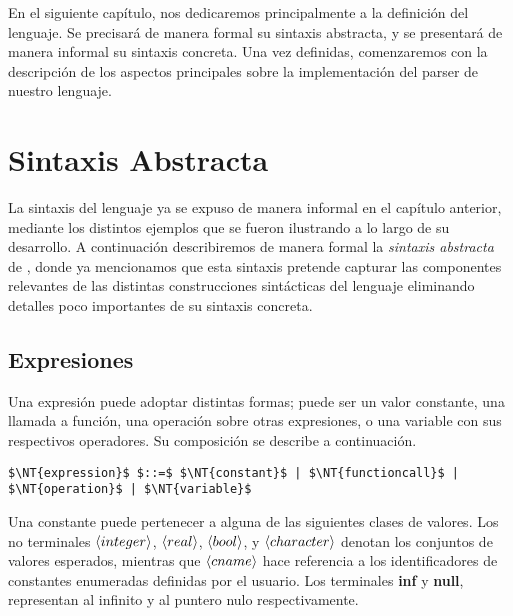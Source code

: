 En el siguiente capítulo, nos dedicaremos principalmente a la definición del lenguaje.
Se precisará de manera formal su sintaxis abstracta, y se presentará de manera informal su sintaxis concreta.
Una vez definidas, comenzaremos con la descripción de los aspectos principales sobre la implementación del parser de nuestro lenguaje.

\section{Sintaxis Abstracta}

La sintaxis del lenguaje ya se expuso de manera informal en el capítulo anterior, mediante los distintos ejemplos que se fueron ilustrando a lo largo de su desarrollo.
A continuación describiremos de manera formal la \textit{sintaxis abstracta} de \Lenguaje{}, donde ya mencionamos que esta sintaxis pretende capturar las componentes relevantes de las distintas construcciones sintácticas del lenguaje eliminando detalles poco importantes de su sintaxis concreta.

\subsection{Expresiones}

Una expresión puede adoptar distintas formas; puede ser un valor constante, una llamada a función, una operación sobre otras expresiones, o una variable con sus respectivos operadores.
Su composición se describe a continuación.

\begin{lstlisting}[style = syntax]
$\NT{expression}$ $::=$ $\NT{constant}$ | $\NT{functioncall}$ | $\NT{operation}$ | $\NT{variable}$
\end{lstlisting}

Una constante puede pertenecer a alguna de las siguientes clases de valores.
Los no terminales $\langle integer \rangle$, $\langle real \rangle$, $\langle bool \rangle$, y $\langle character \rangle$ denotan los conjuntos de valores esperados, mientras que $\langle cname \rangle$ hace referencia a los identificadores de constantes enumeradas definidas por el usuario.
Los terminales \textbf{inf} y \textbf{null}, representan al infinito y al puntero nulo respectivamente.

